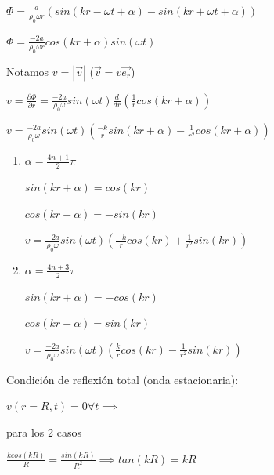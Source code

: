 \documentclass[10pt]{book}
\begin{document}
$\Phi = \frac{a}{\rho_0 \omega r} (sin(kr - \omega t + \alpha) - sin(kr + \omega t + \alpha))  $

$\Phi = \frac{-2a}{\rho_0 \omega r} cos(kr + \alpha) sin(\omega t)  $


Notamos $v = |\vec{v}|$ ($\vec{v} = v \vec{e_r}$)

$v = \frac{\partial \Phi}{\partial r} =  \frac{-2a}{\rho_0 \omega } sin(\omega t) \frac{d}{dr}(\frac{1}{r} cos(kr + \alpha)) $ 

$v = \frac{-2a}{\rho_0 \omega } sin(\omega t)(\frac{-k}{r} sin(kr + \alpha) - \frac{1}{r^2} cos(kr + \alpha) )  $ 

\begin{enumerate}

\item $\alpha = \frac{4n+1}{2} \pi $

$ sin(kr + \alpha) = cos(kr) $

$ cos(kr + \alpha) = -sin(kr) $

$v = \frac{-2a}{\rho_0 \omega } sin(\omega t)(\frac{-k}{r} cos(kr) + \frac{1}{r^2} sin(kr) )  $ 

\item $\alpha = \frac{4n+3}{2} \pi $

$ sin(kr + \alpha) = -cos(kr) $

$ cos(kr + \alpha) = sin(kr) $

$v = \frac{-2a}{\rho_0 \omega } sin(\omega t)(\frac{k}{r} cos(kr) - \frac{1}{r^2} sin(kr) )  $ 


\end{enumerate}






Condición de reflexión total (onda estacionaria):

$v(r=R,t) = 0 \forall t \implies $ 

para los 2 casos

$\frac{k cos(kR)}{R} = \frac{sin(kR)}{R^2} \implies tan(kR) = kR$
\end{document}

